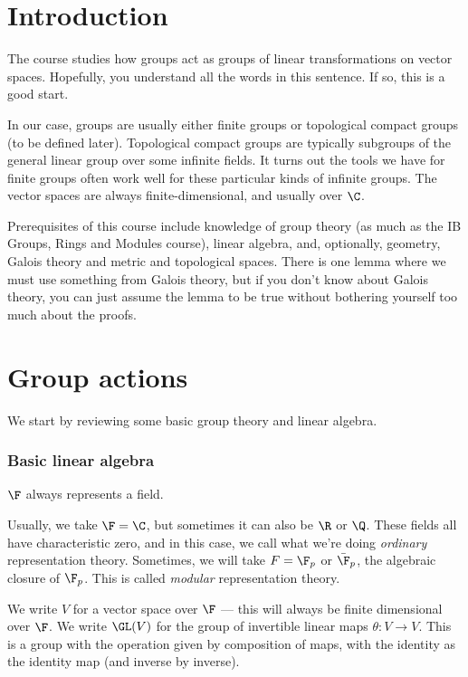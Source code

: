 \documentclass[a4paper]{article}
\begin{document}
\tableofcontents
\setcounter{section}{-1}
\section{Introduction}
The course studies how groups act as groups of linear transformations on vector spaces. Hopefully, you understand all the words in this sentence. If so, this is a good start.

In our case, groups are usually either finite groups or topological compact groups (to be defined later). Topological compact groups are typically subgroups of the general linear group over some infinite fields. It turns out the tools we have for finite groups often work well for these particular kinds of infinite groups. The vector spaces are always finite-dimensional, and usually over $\C$.

Prerequisites of this course include knowledge of group theory (as much as the IB Groups, Rings and Modules course), linear algebra, and, optionally, geometry, Galois theory and metric and topological spaces. There is one lemma where we must use something from Galois theory, but if you don't know about Galois theory, you can just assume the lemma to be true without bothering yourself too much about the proofs.

\section{Group actions}
We start by reviewing some basic group theory and linear algebra.

\subsubsection*{Basic linear algebra}
\begin{notation}
  $\F$ always represents a field.
\end{notation}

Usually, we take $\F = \C$, but sometimes it can also be $\R$ or $\Q$. These fields all have characteristic zero, and in this case, we call what we're doing \emph{ordinary} representation theory. Sometimes, we will take $F = \F_p$ or $\bar{\F}_p$, the algebraic closure of $\F_p$. This is called \emph{modular} representation theory.

\begin{notation}
  We write $V$ for a vector space over $\F$ --- this will always be finite dimensional over $\F$. We write $\GL(V)$ for the group of invertible linear maps $\theta: V \to V$. This is a group with the operation given by composition of maps, with the identity as the identity map (and inverse by inverse).
\end{notation}
\end{document}
